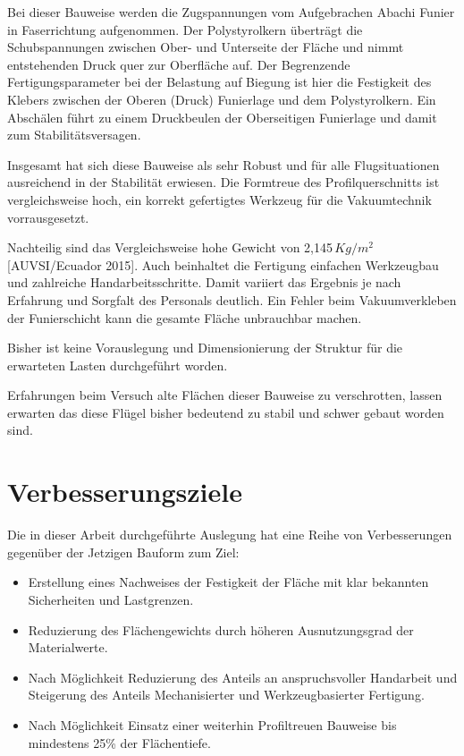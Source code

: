 Bei dieser Bauweise werden die Zugspannungen vom Aufgebrachen Abachi Funier in Faserrichtung aufgenommen. Der Polystyrolkern überträgt die Schubspannungen zwischen Ober- und Unterseite der Fläche und nimmt entstehenden Druck quer zur Oberfläche auf.
Der Begrenzende Fertigungsparameter bei der Belastung auf Biegung ist hier die Festigkeit des Klebers zwischen der Oberen (Druck) Funierlage und dem Polystyrolkern. Ein Abschälen führt zu einem Druckbeulen der Oberseitigen Funierlage und damit zum Stabilitätsversagen.

Insgesamt hat sich diese Bauweise als sehr Robust und für alle Flugsituationen ausreichend in der Stabilität erwiesen.
Die Formtreue des Profilquerschnitts ist vergleichsweise hoch, ein korrekt gefertigtes Werkzeug für die Vakuumtechnik vorrausgesetzt. 

Nachteilig sind das Vergleichsweise hohe Gewicht von 2,145\,$Kg/m^2$ [AUVSI/Ecuador 2015].
Auch beinhaltet die Fertigung einfachen Werkzeugbau und zahlreiche Handarbeitsschritte. Damit variiert das Ergebnis je nach Erfahrung und Sorgfalt des Personals deutlich. Ein Fehler beim Vakuumverkleben der Funierschicht kann die gesamte Fläche unbrauchbar machen. 

Bisher ist keine Vorauslegung und Dimensionierung der Struktur für die erwarteten Lasten durchgeführt worden.

Erfahrungen beim Versuch alte Flächen dieser Bauweise zu verschrotten, lassen erwarten das diese Flügel bisher bedeutend zu stabil und schwer gebaut worden sind. 

\clearpage

\section{Verbesserungsziele}

Die in dieser Arbeit durchgeführte Auslegung hat eine Reihe von Verbesserungen gegenüber der Jetzigen Bauform zum Ziel:
\begin{itemize}
    \item Erstellung eines Nachweises der Festigkeit der Fläche mit klar bekannten Sicherheiten und Lastgrenzen.
    \item Reduzierung des Flächengewichts durch höheren Ausnutzungsgrad der Materialwerte.
    \item Nach Möglichkeit Reduzierung des Anteils an anspruchsvoller Handarbeit und Steigerung des Anteils Mechanisierter und Werkzeugbasierter Fertigung.
    \item Nach Möglichkeit Einsatz einer weiterhin Profiltreuen Bauweise bis mindestens 25\% der Flächentiefe.
    \label{lst:Verbesserungsziele}
\end{itemize}


